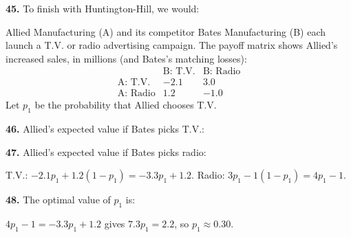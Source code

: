 \documentclass[12pt]{ximera}
\begin{document}
\begin{problem}
\begin{prompt}
\textbf{45.} To finish with Huntington-Hill, we would:
\begin{multipleChoice}
\end{multipleChoice}
\end{prompt}
\end{problem}

\begin{problem}
Allied Manufacturing (A) and its competitor Bates Manufacturing (B) each launch a T.V.
or radio advertising campaign. The payoff matrix shows Allied's increased sales, in
millions (and Bates's matching losses):
\[
\begin{array}{r|rr}
 & \text{B: T.V.} & \text{B: Radio}\\\hline
\text{A: T.V.} & -2.1 & 3.0\\
\text{A: Radio} & 1.2 & -1.0
\end{array}
\]
Let $p_1$ be the probability that Allied chooses T.V.

\begin{prompt}
\textbf{46.} Allied's expected value if Bates picks T.V.:
\begin{multipleChoice}
\end{multipleChoice}
\end{prompt}

\begin{prompt}
\textbf{47.} Allied's expected value if Bates picks radio:
\begin{multipleChoice}
\end{multipleChoice}
\begin{feedback}
T.V.: $-2.1p_1+1.2(1-p_1)=-3.3p_1+1.2$. Radio: $3p_1-1(1-p_1)=4p_1-1$.
\end{feedback}
\end{prompt}

\begin{prompt}
\textbf{48.} The optimal value of $p_1$ is:
\begin{multipleChoice}
\end{multipleChoice}
\begin{feedback}
$4p_1-1=-3.3p_1+1.2$ gives $7.3p_1=2.2$, so $p_1\approx0.30$.
\end{feedback}
\end{prompt}


\end{problem}
\end{document}
